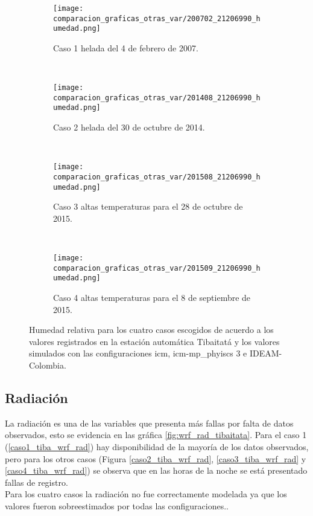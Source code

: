 \begin{figure}[H]

\begin{subfigure}[normla]{0.4\textwidth}
\caption{Caso 1 helada del 4 de febrero de 2007.}
\label{caso1_tiba_wrf_hum}
\texttt{[image: comparacion\_graficas\_otras\_var/200702\_21206990\_humedad.png]}
\end{subfigure}
~
\begin{subfigure}[normla]{0.4\textwidth}
\caption{Caso 2 helada del 30 de octubre de 2014.}
\label{caso2_tiba_wrf_hum}
\texttt{[image: comparacion\_graficas\_otras\_var/201408\_21206990\_humedad.png]}
\end{subfigure}
~
\centering
\begin{subfigure}[normla]{0.4\textwidth}
\caption{Caso 3 altas temperaturas para el 28 de octubre de 2015.}
\label{caso3_tiba_wrf_hum}
\texttt{[image: comparacion\_graficas\_otras\_var/201508\_21206990\_humedad.png]}
\end{subfigure}
~
\centering
\begin{subfigure}[normla]{0.4\textwidth}
\caption{Caso 4 altas temperaturas para el 8 de septiembre de 2015.}
\label{caso4_tiba_wrf_hum}
\texttt{[image: comparacion\_graficas\_otras\_var/201509\_21206990\_humedad.png]}
\end{subfigure}

    \caption{Humedad relativa para los cuatro casos escogidos de acuerdo a los valores registrados en la  estación automática Tibaitatá y los valores simulados con las configuraciones icm, icm-mp\_phyiscs 3 e IDEAM-Colombia.}
    \label{fig:wrf_hum_tibaitata}
\end{figure}


\subsection{Radiación}


La radiación es una de las variables que presenta más fallas por falta de datos observados, esto se evidencia en las gráfica \ref{fig:wrf_rad_tibaitata}. Para el caso 1 (\ref{caso1_tiba_wrf_rad}) hay disponibilidad de la mayoría de los datos observados, pero para los otros casos (Figura \ref{caso2_tiba_wrf_rad}, \ref{caso3_tiba_wrf_rad} y \ref{caso4_tiba_wrf_rad}) se observa que en las horas de la noche se está presentado fallas de registro.\\

Para los cuatro casos la radiación no fue correctamente modelada ya que los valores fueron sobreestimados por todas las configuraciones..\\

